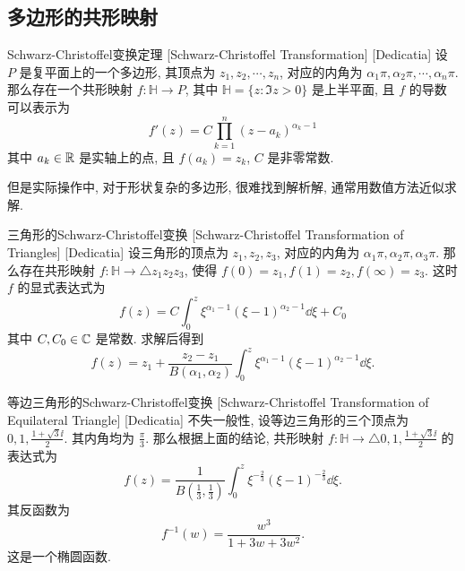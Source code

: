     \subsection{多边形的共形映射}

        \begin{thm}
            {Schwarz-Christoffel变换定理}
            [Schwarz-Christoffel Transformation]
            [Dedicatia]
            设 \(P\) 是复平面上的一个多边形, 其顶点为 \(z_1,z_2,\cdots,z_n\), 对应的内角为 \(\alpha_1\pi,\alpha_2\pi,\cdots,\alpha_n\pi\). 那么存在一个共形映射 \(f:\mathbb{H}\to P\), 其中 \(\mathbb{H}=\{z:\Im z>0\}\) 是上半平面, 且 \(f\) 的导数可以表示为
            \[f'(z)=C\prod_{k=1}^{n}(z-a_k)^{\alpha_k-1}\]
            其中 \(a_k\in\operatorname{\mathbb{R}}\) 是实轴上的点, 且 \(f(a_k)=z_k\), \(C\) 是非零常数.
        \end{thm}

        \begin{rmk}
            [Dedicatia]
            但是实际操作中, 对于形状复杂的多边形, 很难找到解析解, 通常用数值方法近似求解.
        \end{rmk}

        \begin{xmp}
            {三角形的Schwarz-Christoffel变换}
            [Schwarz-Christoffel Transformation of Triangles]
            [Dedicatia]
            设三角形的顶点为 \(z_1,z_2,z_3\), 对应的内角为 \(\alpha_1\pi,\alpha_2\pi,\alpha_3\pi\). 那么存在共形映射 \(f:\mathbb{H}\to \triangle z_1z_2z_3\), 使得 \(f(0)=z_1, f(1)=z_2, f(\infty)=z_3\). 这时 \(f\) 的显式表达式为
            \[f(z)=C\int_{0}^{z}\xi^{\alpha_1-1}(\xi-1)^{\alpha_2-1}\dd{\xi}+C_0\]
            其中 \(C,C_0\in\operatorname{\mathbb{C}}\) 是常数. 求解后得到
            \[f(z)=z_1+\frac{z_2-z_1}{B(\alpha_1,\alpha_2)}\int_{0}^{z}\xi^{\alpha_1-1}(\xi-1)^{\alpha_2-1}\dd{\xi}.\]
        \end{xmp}

        \begin{xmp}
            {等边三角形的Schwarz-Christoffel变换}
            [Schwarz-Christoffel Transformation of Equilateral Triangle]
            [Dedicatia]
            不失一般性, 设等边三角形的三个顶点为 \(0,1,\frac{1+\sqrt{3}\ii}{2}\). 其内角均为 \(\frac{\pi}{3}\). 那么根据上面的结论, 共形映射 \(f:\mathbb{H}\to \triangle 0,1,\frac{1+\sqrt{3}\ii}{2}\) 的表达式为
            \[f(z)=\frac{1}{B(\frac{1}{3},\frac{1}{3})}\int_{0}^{z}\xi^{-\frac{2}{3}}(\xi-1)^{-\frac{2}{3}}\dd{\xi}.\]
            其反函数为 
            \[f^{-1}(w)=\frac{w^3}{1+3w+3w^2}.\]
            这是一个椭圆函数.
        \end{xmp}

